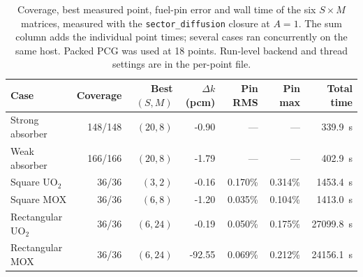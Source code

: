 \begin{table}[htbp]
\centering
\caption{Coverage, best measured point, fuel-pin error and wall time of the six $S\times M$ matrices, measured with the \texttt{sector\_diffusion} closure at $A=1$. The sum column adds the individual point times; several cases ran concurrently on the same host. Packed PCG was used at 18 points. Run-level backend and thread settings are in the per-point file.}
\label{tab:study4-assembly-sector}
\centering\small
\begin{tabular}{l r r r r r r}
\hline
Case & Coverage & Best $(S,M)$ & $\Delta k$ (pcm) & Pin RMS & Pin max & Total time\\
\hline
Strong absorber & 148/148 & $(20,8)$ & -0.90 & --- & --- & 339.9~s\\
Weak absorber & 166/166 & $(20,8)$ & -1.79 & --- & --- & 402.9~s\\
Square UO$_2$ & 36/36 & $(3,2)$ & -0.16 & 0.170\% & 0.314\% & 1453.4~s\\
Square MOX & 36/36 & $(6,8)$ & -1.20 & 0.035\% & 0.104\% & 1413.0~s\\
Rectangular UO$_2$ & 36/36 & $(6,24)$ & -0.19 & 0.050\% & 0.175\% & 27099.8~s\\
Rectangular MOX & 36/36 & $(6,24)$ & -92.55 & 0.069\% & 0.212\% & 24156.1~s\\
\hline
\end{tabular}
\end{table}
